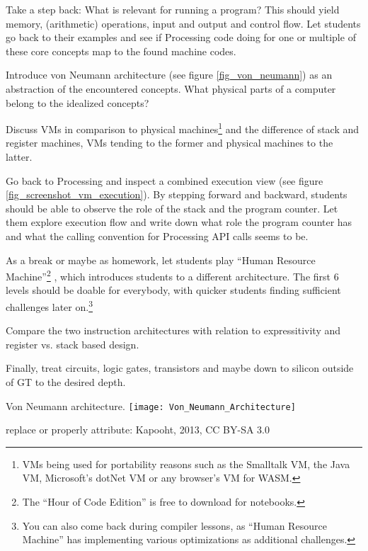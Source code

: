\begin{instructions}
\item Take a step back: What is relevant for running a program? This should yield memory, (arithmetic) operations, input and output and control flow. Let students go back to their examples and see if Processing code doing for one or multiple of these core concepts map to the found machine codes.
\item Introduce von Neumann architecture (see figure \ref{fig_von_neumann}) as an abstraction of the encountered concepts. What physical parts of a computer belong to the idealized concepts?
\item Discuss \acp{VM} in comparison to physical machines\footnote{\acp{VM} being used for portability reasons such as the Smalltalk \ac{VM}, the Java \ac{VM}, Microsoft's dotNet \ac{VM} or any browser's \ac{VM} for WASM.} and the difference of stack and register machines, \acp{VM} tending to the former and physical machines to the latter.
\item Go back to Processing and inspect a combined execution view (see figure \ref{fig_screenshot_vm_execution}). By stepping forward and backward, students should be able to observe the role of the stack and the program counter. Let them explore execution flow and write down what role the program counter has and what the calling convention for Processing \ac{API} calls seems to be.
\item As a break or maybe as homework, let students play ``Human Resource Machine''\footnote{The ``Hour of Code Edition'' is free to download for notebooks.} \cite{Tom15}, which introduces students to a different architecture. The first 6 levels should be doable for everybody, with quicker students finding sufficient challenges later on.\footnote{You can also come back during compiler lessons, as ``Human Resource Machine'' has implementing various optimizations as additional challenges.}
\item Compare the two instruction architectures with relation to expressitivity and register vs. stack based design.

\item Finally, treat circuits, logic gates, transistors and maybe down to silicon outside of \ac{GT} to the desired depth.
\end{instructions}

\begin{cfigure}{Von Neumann architecture.}
\texttt{[image: Von\_Neumann\_Architecture]}
\begin{todo}
\item replace or properly attribute: Kapooht, 2013, CC BY-SA 3.0
\end{todo}
\end{cfigure}


